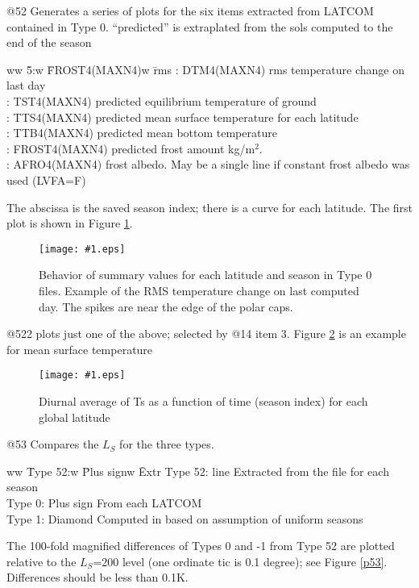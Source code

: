 \documentclass{article}  %
\newcommand{\igc}[1]{\texttt{[image: \#1.eps]}}
\begin{document}
@52 Generates a series of plots for the six items extracted from LATCOM
contained in Type 0. ``predicted'' is extraplated from the sols computed to the
end of the season
\vspace{-3.mm} \begin{tabbing}
ww \= 5:w \= FROST4(MAXN4)w \= rms \kill
 : \> DTM4(MAXN4)   \> rms temperature change on last day \\
 : \> TST4(MAXN4)   \> predicted equilibrium temperature of ground \\
 : \> TTS4(MAXN4)   \> predicted mean surface temperature for each latitude \\
 : \> TTB4(MAXN4)   \> predicted mean bottom temperature \\
 : \> FROST4(MAXN4) \> predicted frost amount kg/m$^2$. \\
 : \>  AFRO4(MAXN4)  \> frost albedo. May be a single line if constant frost albedo was used (LVFA=F) \\
\end{tabbing}  \vspace{-3.mm}
The abscissa is the saved season index; there is a curve for each latitude. The first plot is shown in Figure \ref{p52a}.
 
\begin{figure}[!ht] \igc{p52a}
\caption[Type 0 summary] {Behavior of summary values for each latitude and season in Type 0 files. Example of 
the RMS temperature change on last computed day. The spikes are near the edge of the polar caps. \label{p52a} } \end{figure}

@522 plots just one of the above; selected by  @14 item 3. Figure \ref{p522} is an example for mean surface temperature

\begin{figure}[!ht] \igc{p522}
\caption[Diurnal Mean Ts] {Diurnal average of Ts as a function of time (season index) for each global latitude 
\label{p522} } \end{figure}

@53 Compares the $L_S$ for the three types. 
 \vspace{-5.mm} \begin{tabbing}
ww \= Type 52:w \= Plus signw \= Extr \kill
 \> Type 52: \> line \>    Extracted from the file for each season \\
 \> Type 0: \>  Plus sign\>  From each LATCOM \\
 \> Type 1:  \> Diamond \>  Computed in  based on assumption of uniform seasons \\ 
\end{tabbing}
 The 100-fold magnified differences of Types 0 and -1 from Type 52  are plotted relative to the $L_S$=200 level (one ordinate tic is 0.1 degree); see Figure \ref{p53}. Differences should be less than 0.1K.
\end{document}
